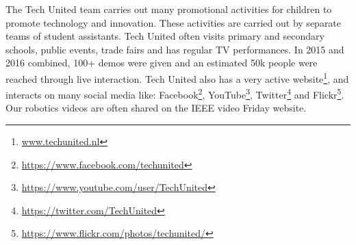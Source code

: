 The Tech United team carries out many promotional activities for children to promote technology and innovation. These activities are carried out by separate teams of student assistants. Tech United often visits primary and secondary schools, public events, trade fairs and has regular TV performances. In 2015 and 2016 combined, 100+ demos were given and an estimated 50k people were reached through live interaction.
Tech United also has a very active website\footnote{\url{www.techunited.nl}}, and interacts on many social media like: Facebook\footnote{\url{https://www.facebook.com/techunited}}, YouTube\footnote{\url{https://www.youtube.com/user/TechUnited}}, Twitter\footnote{\url{https://twitter.com/TechUnited}} and Flickr\footnote{\url{https://www.flickr.com/photos/techunited/}}. Our robotics videos are often shared on the IEEE video Friday website.